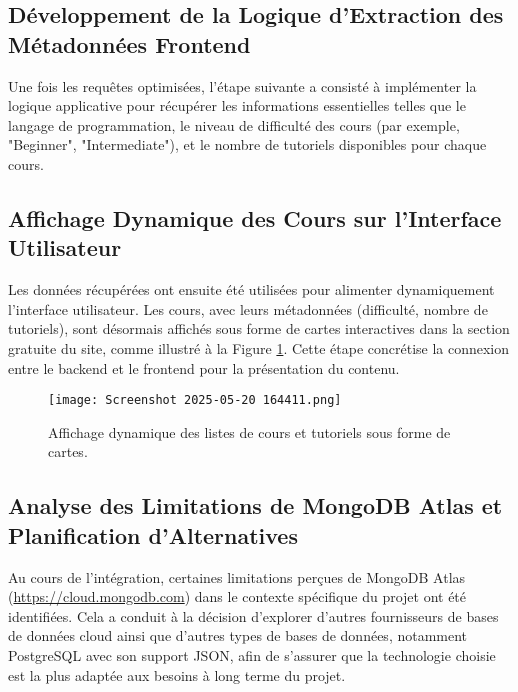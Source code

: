 \documentclass[12pt, a4paper]{article}
\begin{document}
\subsection{Développement de la Logique d'Extraction des Métadonnées Frontend}
Une fois les requêtes optimisées, l'étape suivante a consisté à implémenter la logique applicative pour récupérer les informations essentielles telles que le langage de programmation, le niveau de difficulté des cours (par exemple, "Beginner", "Intermediate"), et le nombre de tutoriels disponibles pour chaque cours.

\subsection{Affichage Dynamique des Cours sur l'Interface Utilisateur}
Les données récupérées ont ensuite été utilisées pour alimenter dynamiquement l'interface utilisateur. Les cours, avec leurs métadonnées (difficulté, nombre de tutoriels), sont désormais affichés sous forme de cartes interactives dans la section gratuite du site, comme illustré à la Figure \ref{fig:dynamic_course_cards}. Cette étape concrétise la connexion entre le backend et le frontend pour la présentation du contenu.

\begin{figure}[htbp]
  \centering
  \texttt{[image: Screenshot 2025-05-20 164411.png]} %
  \caption{Affichage dynamique des listes de cours et tutoriels sous forme de cartes.} %
  \label{fig:dynamic_course_cards} %
\end{figure}

\subsection{Analyse des Limitations de MongoDB Atlas et Planification d'Alternatives}
Au cours de l'intégration, certaines limitations perçues de MongoDB Atlas (\url{https://cloud.mongodb.com}) dans le contexte spécifique du projet ont été identifiées. Cela a conduit à la décision d'explorer d'autres fournisseurs de bases de données cloud ainsi que d'autres types de bases de données, notamment PostgreSQL avec son support JSON, afin de s'assurer que la technologie choisie est la plus adaptée aux besoins à long terme du projet.
\end{document}
